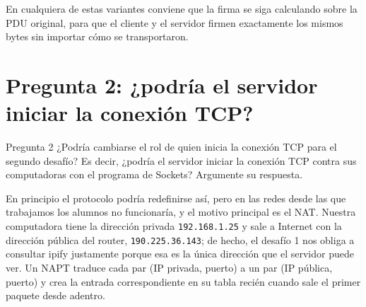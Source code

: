 \documentclass[11pt,a4paper]{article}
\newcommand{\code}[1]{\texttt{#1}}
\begin{document}
En cualquiera de estas variantes conviene que la firma se siga calculando sobre la PDU original, para que el cliente y el servidor firmen exactamente los mismos bytes sin importar cómo se transportaron.

\section{Pregunta 2: ¿podría el servidor iniciar la conexión TCP?}

\begin{pregunta}{Pregunta 2}
¿Podría cambiarse el rol de quien inicia la conexión TCP para el segundo desafío? Es decir, ¿podría el servidor iniciar la conexión TCP contra sus computadoras con el programa de Sockets? Argumente su respuesta.
\end{pregunta}

En principio el protocolo podría redefinirse así, pero en las redes desde las que trabajamos los alumnos no funcionaría, y el motivo principal es el NAT. Nuestra computadora tiene la dirección privada \code{192.168.1.25} y sale a Internet con la dirección pública del router, \code{190.225.36.143}; de hecho, el desafío 1 nos obliga a consultar ipify justamente porque esa es la única dirección que el servidor puede ver. Un NAPT traduce cada par (IP privada, puerto) a un par (IP pública, puerto) y crea la entrada correspondiente en su tabla recién cuando sale el primer paquete desde adentro.

\begin{center}
\end{center}
\end{document}
